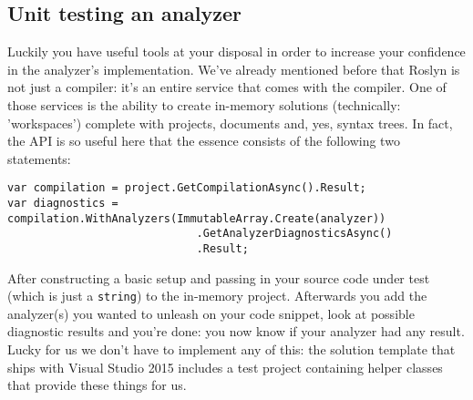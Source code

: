 \subsection{Unit testing an analyzer}
\label{sec:diagnostic-unit-testing}

Luckily you have useful tools at your disposal in order to increase your confidence in the analyzer's implementation. We've already mentioned before that Roslyn is not just a compiler: it's an entire service that comes with the compiler. One of those services is the ability to create in-memory solutions (technically: 'workspaces') complete with projects, documents and, yes, syntax trees. In fact, the API is so useful here that the essence consists of the following two statements:

\begin{lstlisting}[label={sec:diagnostics-unit-tests-analysis}]
var compilation = project.GetCompilationAsync().Result;
var diagnostics = compilation.WithAnalyzers(ImmutableArray.Create(analyzer))
                             .GetAnalyzerDiagnosticsAsync()
                             .Result;
\end{lstlisting}

After constructing a basic setup and passing in your source code under test (which is just a \texttt{string}) to the in-memory project. Afterwards you add the analyzer(s) you wanted to unleash on your code snippet, look at possible diagnostic results and you're done: you now know if your analyzer had any result. Lucky for us we don't have to implement any of this: the solution template that ships with Visual Studio 2015 includes a test project containing helper classes that provide these things for us.




